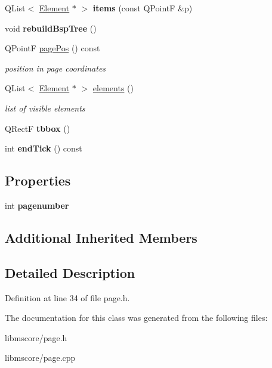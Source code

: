 \begin{DoxyCompactItemize}
\mbox{\label{class_ms_1_1_page_ada0c95d1933617435c4ea3c29bc4137f}} 
Q\+List$<$ \hyperlink{class_ms_1_1_element}{Element} $\ast$ $>$ {\bfseries items} (const Q\+PointF \&p)
\item 
\mbox{\label{class_ms_1_1_page_adb26ac04b2bb7c6d3c1d7f61d361daa1}} 
void {\bfseries rebuild\+Bsp\+Tree} ()
\item 
\mbox{\label{class_ms_1_1_page_ac1048abc9de2451bc987f1a9dd447ce9}} 
Q\+PointF \hyperlink{class_ms_1_1_page_ac1048abc9de2451bc987f1a9dd447ce9}{page\+Pos} () const
\begin{DoxyCompactList}\small\item\em position in page coordinates \end{DoxyCompactList}\item 
\mbox{\label{class_ms_1_1_page_a4d8300d59619da538673d4be4d9e3157}} 
Q\+List$<$ \hyperlink{class_ms_1_1_element}{Element} $\ast$ $>$ \hyperlink{class_ms_1_1_page_a4d8300d59619da538673d4be4d9e3157}{elements} ()
\begin{DoxyCompactList}\small\item\em list of visible elements \end{DoxyCompactList}\item 
\mbox{\label{class_ms_1_1_page_aa31881042cfe909a7b321526c035fead}} 
Q\+RectF {\bfseries tbbox} ()
\item 
\mbox{\label{class_ms_1_1_page_a342809366572d66a6383905f921ae1ef}} 
int {\bfseries end\+Tick} () const
\end{DoxyCompactItemize}
\subsection*{Properties}
\begin{DoxyCompactItemize}
\item 
\mbox{\label{class_ms_1_1_page_a70e42a60c8ba83912d93e9c5c8dd25ac}} 
int {\bfseries pagenumber}
\end{DoxyCompactItemize}
\subsection*{Additional Inherited Members}


\subsection{Detailed Description}


Definition at line 34 of file page.\+h.



The documentation for this class was generated from the following files\+:\begin{DoxyCompactItemize}
\item 
libmscore/page.\+h\item 
libmscore/page.\+cpp\end{DoxyCompactItemize}
